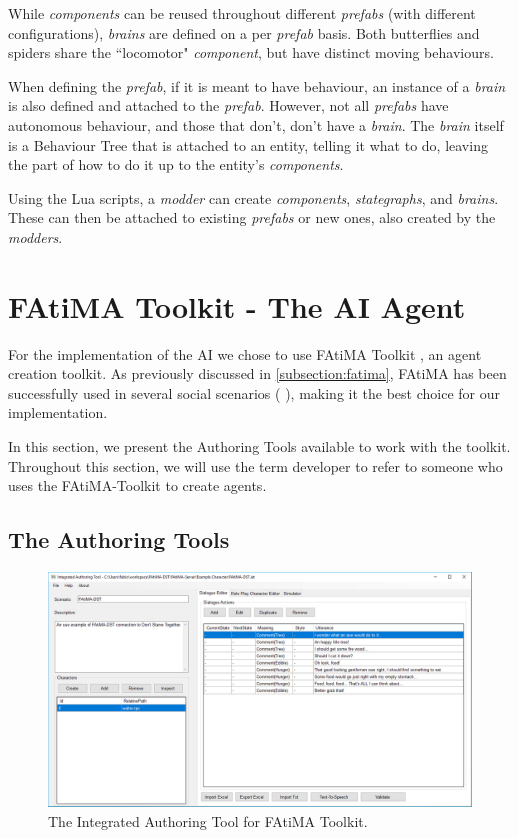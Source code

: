 While \textit{components} can be reused throughout different \textit{prefabs} (with different configurations), \textit{brains} are defined on a per \textit{prefab} basis.
Both butterflies and spiders share the ``locomotor" \textit{component}, but have distinct moving behaviours.

When defining the \textit{prefab}, if it is meant to have behaviour, an instance of a \textit{brain} is also defined and attached to the \textit{prefab}.
However, not all \textit{prefabs} have autonomous behaviour, and those that don't, don't have a \textit{brain}.
The \textit{brain} itself is a Behaviour Tree that is attached to an entity, telling it what to do, leaving the part of how to do it up to the entity's \textit{components}.

Using the Lua scripts, a \textit{modder} can create \textit{components}, \textit{stategraphs}, and \textit{brains}.
These can then be attached to existing \textit{prefabs} or new ones, also created by the \textit{modders}.

\section{FAtiMA Toolkit - The AI Agent}

\noindent For the implementation of the \ac{AI} we chose to use \ac{FAtiMA} Toolkit \cite{dias:fatima-modular}, an agent creation toolkit.
As previously discussed in \ref{subsection:fatima}, \ac{FAtiMA} has been successfully used in several social scenarios (\cite{paiva:learning-by-feeling} \cite{rodrigues:i-can-feel-to} \cite{aylett:intercultural-empathy} \cite{correia:sueca}), making it the best choice for our implementation.

In this section, we present the Authoring Tools available to work with the toolkit.
Throughout this section, we will use the term developer to refer to someone who uses the FAtiMA-Toolkit to create agents.

\subsection{The Authoring Tools}

\begin{figure}
  \centering
  \includegraphics[width=\textwidth]{./Images/iat-interface}
  \caption{The Integrated Authoring Tool for \ac{FAtiMA} Toolkit.}
  \label{fig:iat-interface}
\end{figure}

